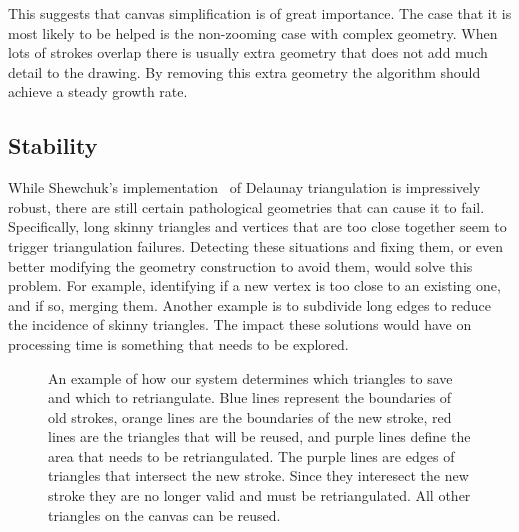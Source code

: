 \documentclass[review,draft]{acmsiggraph}
\begin{document}
This suggests that canvas simplification is of great importance.
The case that it is most likely to be helped is the non-zooming case with complex geometry. When lots of strokes
overlap there is usually extra geometry that does not add much detail to the drawing. By removing
this extra geometry the algorithm should achieve a steady growth rate.

\subsection{Stability} 

While Shewchuk's implementation~ of Delaunay triangulation is impressively robust, there are still certain pathological geometries that can cause it to fail.  Specifically, long skinny triangles and vertices that are too close together seem to trigger triangulation failures.  Detecting these situations and fixing them, or even better modifying the geometry construction to avoid them, would solve this problem.  For example, identifying if a new vertex is too close to an existing one, and if so, merging them.  Another example is to subdivide long edges to reduce the incidence of skinny triangles.  The impact these solutions would have on processing time is something that needs to be explored.

\begin{figure}
    \centering
    \caption{An example of how our system determines which triangles to save and which to retriangulate. Blue
    lines represent the boundaries of old strokes, orange lines are the boundaries of the new stroke, red lines are
    the triangles that will be reused, and purple lines define the area that needs to be retriangulated. The purple
    lines are edges of triangles that intersect the new stroke. Since they interesect the new stroke they are no
    longer valid and must be retriangulated. All other triangles on the canvas can be reused.}
    \label{fig:modified}
\end{figure}
\end{document}
